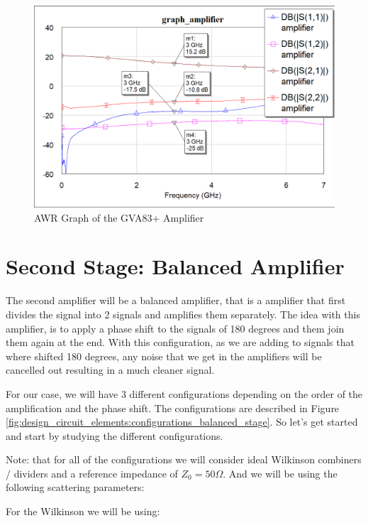 \documentclass[12pt]{report} %
\let\oldsection\section
\renewcommand\section{\clearpage\oldsection}
\begin{document}
\begin{figure}[htbp]
    \centering
    \includegraphics[width=\textwidth]{images/design_circuit_elements/graph_amplifier.png}
    \caption{AWR Graph of the GVA83+ Amplifier}
    \label{fig:design_circuit_elements:graph_amplifier}
\end{figure}

\section{Second Stage: Balanced Amplifier}

The second amplifier will be a balanced amplifier, that is a amplifier that first divides the signal into 2 signals and amplifies them separately. The idea with this amplifier, is to apply a phase shift to the signals of 180 degrees and them join them again at the end. With this configuration, as we are adding to signals that where shifted 180 degrees, any noise that we get in the amplifiers will be cancelled out resulting in a much cleaner signal.

For our case, we will have 3 different configurations depending on the order of the amplification and the phase shift. The configurations are described in Figure \ref{fig:design_circuit_elements:configurations_balanced_stage}. So let's get started and start by studying the different configurations.

Note: that for all of the configurations we will consider ideal Wilkinson combiners / dividers and a reference impedance of $Z_0 = 50 \Omega$. And we will be using the following scattering parameters:

For the Wilkinson we will be using: 
\end{document}
